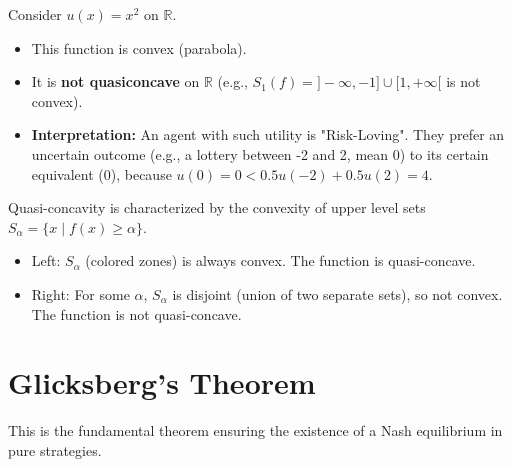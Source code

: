 \begin{exemple}
Consider $u(x) = x^2$ on $\mathbb{R}$.
\begin{itemize}
    \item This function is convex (parabola).
    \item It is \textbf{not quasiconcave} on $\mathbb{R}$ (e.g., $S_1(f) = ]-\infty, -1] \cup [1, +\infty[$ is not convex).
    \item \textbf{Interpretation:} An agent with such utility is "Risk-Loving". They prefer an uncertain outcome (e.g., a lottery between -2 and 2, mean 0) to its certain equivalent (0), because $u(0)=0 < 0.5 u(-2) + 0.5 u(2) = 4$.
\end{itemize}

\begin{center}
\end{center}
\begin{figureexplanation}
Quasi-concavity is characterized by the convexity of upper level sets $S_\alpha = \{x \mid f(x) \ge \alpha\}$.
\begin{itemize}
    \item Left: $S_\alpha$ (colored zones) is always convex. The function is quasi-concave.
    \item Right: For some $\alpha$, $S_\alpha$ is disjoint (union of two separate sets), so not convex. The function is not quasi-concave.
\end{itemize}
\end{figureexplanation}

\end{exemple}

\section{Glicksberg's Theorem}
This is the fundamental theorem ensuring the existence of a Nash equilibrium in pure strategies.


